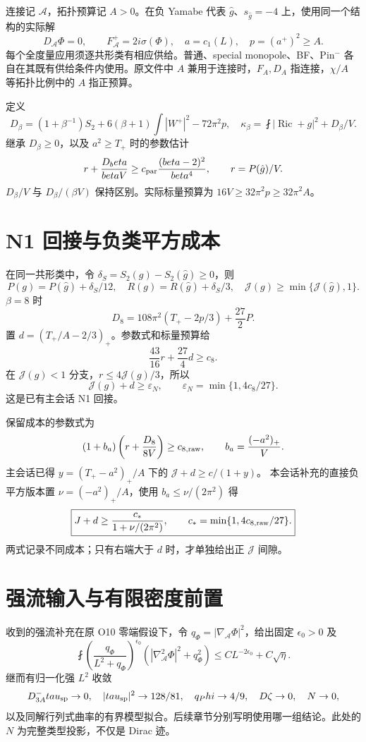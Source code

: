 \documentclass[UTF8,11pt,fontset=none]{ctexart}
\begin{document}
连接记 \(\mathcal A\)，拓扑预算记 \(A>0\)。在负 Yamabe 代表 \(\hat g\)、\(s_{\hat g}=-4\) 上，使用同一个结构的实际解 \[
D_{\mathcal A}\Phi=0,\qquad F_{\mathcal A}^+=2i\sigma(\Phi),
\quad a=c_1(L),\quad p=(a^+)^2\ge A.
\] 每个全度量应用须逐共形类有相应供给。普通、special monopole、BF、Pin\(^-\) 各自在其既有供给条件内使用。原文件中 \(A\) 兼用于连接时，\(F_A,D_A\) 指连接，\(\chi/A\) 等拓扑比例中的 \(A\) 指正预算。\cite{Base,N1}

定义 \[
D_\beta=(1+\beta^{-1})S_2+6(\beta+1)\int|W^+|^2-72\pi^2p,
\quad\kappa_\beta=\fint|\operatorname{Ric}+g|^2+D_\beta/V.
\] 继承 \(D_\beta\ge0\)，以及 \(a^2\ge T_+\) 时的参数估计 \[
r+\frac{D_\beta}{\beta V}\ge c_{\rm par}
\frac{(\beta-2)^2}{\beta^4},\qquad r=P(\hat g)/V.
\] \(D_\beta/V\) 与 \(D_\beta/(\beta V)\) 保持区别。实际标量预算为 \(16V\ge32\pi^2p\ge32\pi^2A\)。

\section{N1 回接与负类平方成本}\label{ch0:n1-ux56deux63a5ux4e0eux8d1fux7c7bux5e73ux65b9ux6210ux672c}

在同一共形类中，令 \(\delta_S=S_2(g)-S_2(\hat g)\ge0\)，则 \[
P(g)=P(\hat g)+\delta_S/12,\quad R(g)=R(\hat g)+\delta_S/3,
\quad\mathcal J(g)\ge\min\{\mathcal J(\hat g),1\}.
\] \(\beta=8\) 时 \[
D_8=108\pi^2(T_+-2p/3)+\frac{27}{2}P.
\] 置 \(d=(T_+/A-2/3)_+\)。参数式和标量预算给 \[
\frac{43}{16}r+\frac{27}{4}d\ge c_8.
\] 在 \(\mathcal J(g)<1\) 分支，\(r\le4\mathcal J(g)/3\)，所以 \[
\mathcal J(g)+d\ge\varepsilon_N,
\qquad\varepsilon_N=\min\{1,4c_8/27\}.
\] 这是已有主会话 N1 回接。\cite{N1}

保留成本的参数式为 \[
(1+b_a)\left(r+\frac{D_8}{8V}\right)\ge c_{8,\rm raw},
\qquad b_a=\frac{(-a^2)_+}{V}.
\] 主会话已得 \(y=(T_+-a^2)_+/A\) 下的 \(\mathcal J+d\ge c/(1+y)\)。 本会话补充的直接负平方版本置 \(\nu=(-a^2)_+/A\)，使用 \(b_a\le\nu/(2\pi^2)\) 得 \[
\boxed{\mathcal J+d\ge
\frac{c_*}{1+\nu/(2\pi^2)},\qquad
c_* =\min\{1,4c_{8,\rm raw}/27\}.}
\] 两式记录不同成本；只有右端大于 \(d\) 时，才单独给出正 \(\mathcal J\) 间隙。

\section{强流输入与有限密度前置}\label{ch0:ux5f3aux6d41ux8f93ux5165ux4e0eux6709ux9650ux5bc6ux5ea6ux524dux7f6e}

收到的强流补充在原 O10 零端假设下，令 \(q_\Phi=|\nabla_{\mathcal A}\Phi|^2\)，给出固定 \(\epsilon_0>0\) 及 \[
\fint\left(\frac{q_\Phi}{L^2+q_\Phi}\right)^{\epsilon_0}
\left(|\nabla_{\mathcal A}^2\Phi|^2+q_\Phi^2\right)
\le CL^{-2\epsilon_0}+C\sqrt\eta.
\] 继而有归一化强 \(L^2\) 收敛 \[
D^-_{3\mathcal A}\tau_{\rm sp}\to0,\quad
|\tau_{\rm sp}|^2\to128/81,\quad q_\Phi\to4/9,
\quad\nabla\zeta\to0,\quad N\to0,
\] 以及同解行列式曲率的有界模型拟合。后续章节分别写明使用哪一组结论。此处的 \(N\) 为完整类型投影，不仅是 Dirac 迹。\cite{Strong}
\end{document}
